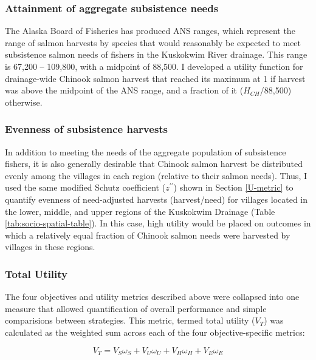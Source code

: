 \documentclass[12pt,]{book}
\theoremstyle{definition}
\theoremstyle{definition}
\theoremstyle{definition}
\theoremstyle{remark}
\begin{document}
\subsubsection{Attainment of aggregate subsistence
needs}\label{attainment-of-aggregate-subsistence-needs}

\noindent
The Alaska Board of Fisheries has produced ANS ranges, which represent
the range of salmon harvests by species that would reasonably be
expected to meet subsistence salmon needs of fishers in the Kuskokwim
River drainage. This range is 67,200 -- 109,800, with a midpoint of
88,500. I developed a utility function for drainage-wide Chinook salmon
harvest that reached its maximum at 1 if harvest was above the midpoint
of the ANS range, and a fraction of it (\(H_{CH}\)/88,500) otherwise.

\subsubsection{Evenness of subsistence
harvests}\label{evenness-of-subsistence-harvests}

\noindent
In addition to meeting the needs of the aggregate population of
subsistence fishers, it is also generally desirable that Chinook salmon
harvest be distributed evenly among the villages in each region
(relative to their salmon needs). Thus, I used the same modified Schutz
coefficient (\(z^{\prime\prime}\)) shown in Section \ref{U-metric} to
quantify evenness of need-adjusted harvests (harvest/need) for villages
located in the lower, middle, and upper regions of the Kuskokwim
Drainage (Table \ref{tab:socio-spatial-table}). In this case, high
utility would be placed on outcomes in which a relatively equal fraction
of Chinook salmon needs were harvested by villages in these regions.

\subsubsection{Total Utility}\label{total-utility}

\noindent
The four objectives and utility metrics described above were collapsed
into one measure that allowed quantification of overall performance and
simple comparisions between strategies. This metric, termed total
utility (\(V_T\)) was calculated as the weighted sum across each of the
four objective-specific metrics:

\begin{equation}
  V_T = V_S \omega_S + V_U \omega_U + V_H \omega_H + V_E \omega_E
  \label{eq:get-vt}
\end{equation}
\end{document}
